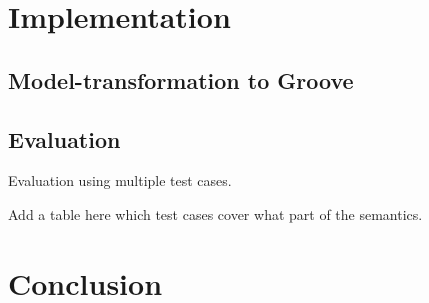 \documentclass[adraft, copyright, creativecommons]{eptcs} %
\begin{document}
\section{Implementation}
\subsection{Model-transformation to Groove}
\subsection{Evaluation}
Evaluation using multiple test cases.

Add a table here which test cases cover what part of the semantics.
\section{Conclusion}


\end{document}
